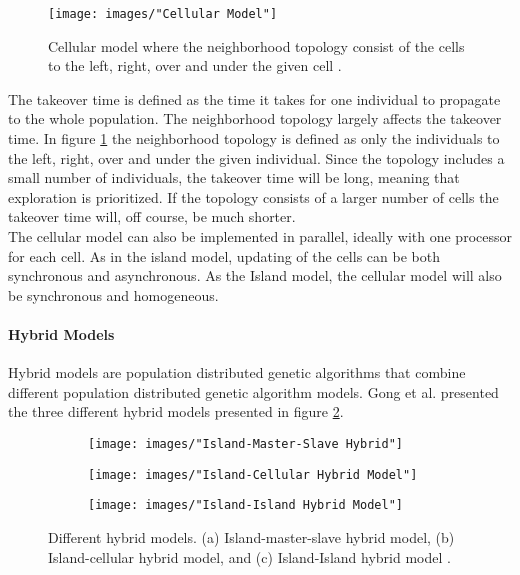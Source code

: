 \begin{figure}[h!]
\begin{center}
\texttt{[image: images/"Cellular Model"]}
\caption{Cellular model where the neighborhood topology consist of the cells to the left, right, over and under the given cell \citep{Gong}.}
\label{Cellular model}
\end{center}
\end{figure}


\noindent The takeover time is defined as the time it takes for one individual to propagate to the whole population. The neighborhood topology largely affects the takeover time. In figure \ref{Cellular model} the neighborhood topology is defined as only the individuals to the left, right, over and under the given individual. Since the topology includes a small number of individuals, the takeover time will be long, meaning that exploration is prioritized. If the topology consists of a larger number of cells the takeover time will, off course, be much shorter.\\


\noindent The cellular model can also be implemented in parallel, ideally with one processor for each cell. As in the island model, updating of the cells can be both synchronous and asynchronous. As the Island model, the cellular model will also be synchronous and homogeneous.


\paragraph*{Hybrid Models}
Hybrid models are population distributed genetic algorithms that combine different population distributed genetic algorithm models. Gong et al. presented the three different hybrid models presented in figure \ref{Hybrid Models}.\\


\begin{figure}[h!]
    \centering
    \begin{subfigure}[b]{0.3\textwidth}
        \texttt{[image: images/"Island-Master-Slave Hybrid"]}
        \caption{}
    \end{subfigure}
    \begin{subfigure}[b]{0.3\textwidth}
        \texttt{[image: images/"Island-Cellular Hybrid Model"]}
        \caption{}
    \end{subfigure}
    \begin{subfigure}[b]{0.3\textwidth}
        \texttt{[image: images/"Island-Island Hybrid Model"]}
        \caption{}
    \end{subfigure}
    \caption{Different hybrid models. (a) Island-master-slave hybrid model, (b) Island-cellular hybrid model, and (c) Island-Island hybrid model \citep{Gong}.}
    \label{Hybrid Models}
\end{figure}


